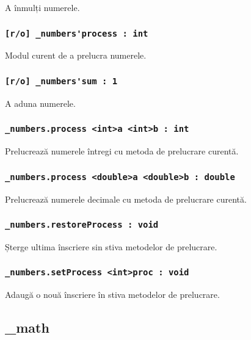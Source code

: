 A înmulți numerele.

\subsubsection{\lstinline|[r/o] _numbers'process : int|}

Modul curent de a prelucra numerele.

\subsubsection{\lstinline|[r/o] _numbers'sum : 1|}

A aduna numerele.

\subsubsection{\lstinline|_numbers.process <int>a <int>b : int|}

Prelucrează numerele întregi cu metoda de prelucrare curentă.

\subsubsection{\lstinline|_numbers.process <double>a <double>b : double|}

Prelucrează numerele decimale cu metoda de prelucrare curentă.

\subsubsection{\lstinline|_numbers.restoreProcess : void|}

Șterge ultima înscriere sin stiva metodelor de prelucrare.

\subsubsection{\lstinline|_numbers.setProcess <int>proc : void|}

Adaugă o nouă înscriere în stiva metodelor de prelucrare.

\subsection{{\color{orange} \_math}}

